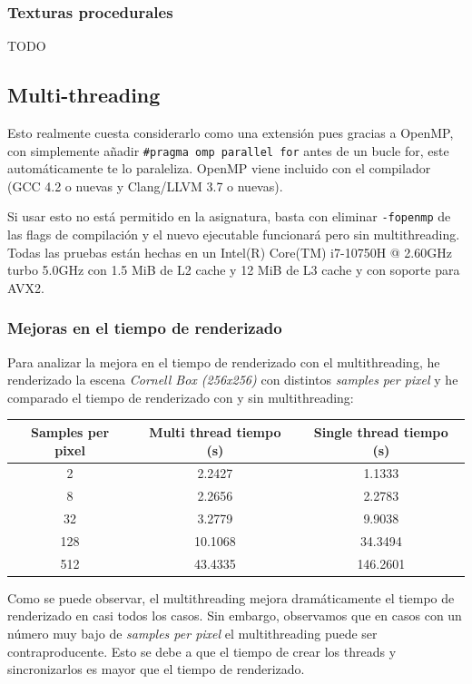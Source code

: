 \documentclass{article}
\begin{document}
\subsubsection{Texturas procedurales}
TODO

\subsection{Multi-threading}
Esto realmente cuesta considerarlo como una extensión pues gracias a OpenMP, con
simplemente añadir \texttt{\#pragma omp parallel for} antes de un bucle for,
este automáticamente te lo paraleliza. OpenMP viene incluido con el compilador
(GCC 4.2 o nuevas y Clang/LLVM 3.7 o nuevas).

Si usar esto no está permitido en la asignatura, basta con eliminar
\texttt{-fopenmp} de las flags de compilación y el nuevo ejecutable funcionará
pero sin multithreading. \\

Todas las pruebas están hechas en un Intel(R) Core(TM) i7-10750H @ 2.60GHz turbo
5.0GHz con 1.5 MiB de L2 cache y 12 MiB de L3 cache y con soporte para AVX2.

\subsubsection{Mejoras en el tiempo de renderizado}

Para analizar la mejora en el tiempo de renderizado con el multithreading, he
renderizado la escena \textit{Cornell Box (256x256)} con distintos \textit{samples per
  pixel} y he comparado el tiempo de renderizado con y sin multithreading:

\begin{center}
\begin{tabular}{||c c c||}
 \hline
 Samples per pixel & Multi thread tiempo (s) & Single thread tiempo (s) \\ [0.5ex]
 \hline\hline
 2 & 2.2427 & 1.1333 \\
 \hline
 8 & 2.2656 & 2.2783 \\
 \hline
 32 & 3.2779 & 9.9038 \\
 \hline
 128 & 10.1068 & 34.3494 \\
 \hline
 512 & 43.4335 & 146.2601 \\ [1ex]
 \hline
\end{tabular}
\end{center}

Como se puede observar, el multithreading mejora dramáticamente el tiempo de
renderizado en casi todos los casos. Sin embargo, observamos que en casos con un
número muy bajo de \textit{samples per pixel} el multithreading puede ser
contraproducente. Esto se debe a que el tiempo de crear los threads y
sincronizarlos es mayor que el tiempo de renderizado.
\end{document}
